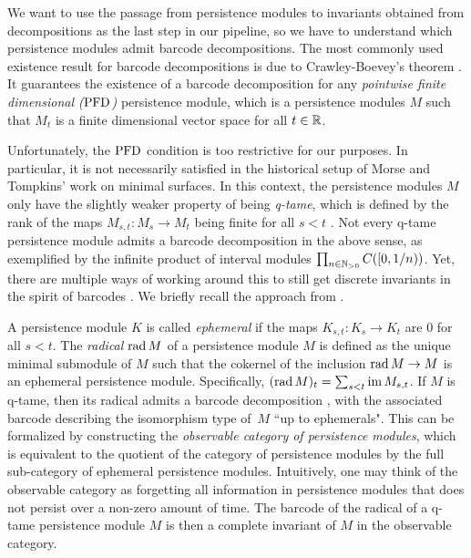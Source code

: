 We want to use the passage from persistence modules to invariants obtained from decompositions as the last step in our pipeline, so we have to understand which persistence modules admit barcode decompositions.
The most commonly used existence result for barcode decompositions is due to Crawley-Boevey's theorem \cite{Crawley-Boevey.2015}. It guarantees the existence of a barcode decomposition for any \emph{pointwise finite dimensional ($\mathrm{PFD}$)} persistence module, which is a persistence modules $M$ such that $M_t$ is a finite dimensional vector space for all $t \in \mathbb{R}$.

Unfortunately, the $\mathrm{PFD}$ condition is too restrictive for our purposes. In particular, it is not necessarily satisfied in the historical setup of Morse and Tompkins' work on minimal surfaces. In this context, the persistence modules $M$ only have the slightly weaker property of being \emph{q-tame}, which is defined by the rank of the maps $M_{s,t} \colon M_s \to M_t$ being finite for all $s < t$  \cite{Chazal.2016a}. 
Not every q-tame persistence module admits a barcode decomposition in the above sense, as exemplified by the infinite product of interval modules $\prod_{n \in \mathbb{N}_{> 0}} C([0,1/n))$. Yet, there are multiple ways of working around this to still get discrete invariants in the spirit of barcodes \cite{Chazal.2016a, Chazal.2016b, schmahl2020structure}. We briefly recall the approach from \citet{Chazal.2016b}.

A persistence module $K$ is called \emph{ephemeral} if the maps $K_{s,t} \colon K_s \to K_t$ are $0$ for all $s < t$.
The \emph{radical} $\operatorname{rad} M$ of a persistence module $M$ is defined as the unique minimal submodule of $M$ such that the cokernel of the inclusion $\operatorname{rad} M \to M$ is an ephemeral persistence module.
Specifically, $(\operatorname{rad} M)_t = \sum_{s<t}\operatorname{im} M_{s,t}$.
If $M$ is q-tame, then its radical admits a barcode decomposition \cite[Corollary~3.6]{Chazal.2016b},
with the associated barcode describing the isomorphism type of~$M$ ``up to ephemerals".
This can be formalized by constructing the \emph{observable category of persistence modules}, which is equivalent to the quotient of the category of persistence modules by the full sub-category of ephemeral persistence modules.
Intuitively, one may think of the observable category as forgetting all information in persistence modules that does not persist over a non-zero amount of time.
The barcode of the radical of a q-tame persistence module $M$ is then a complete invariant of $M$ in the observable category.


